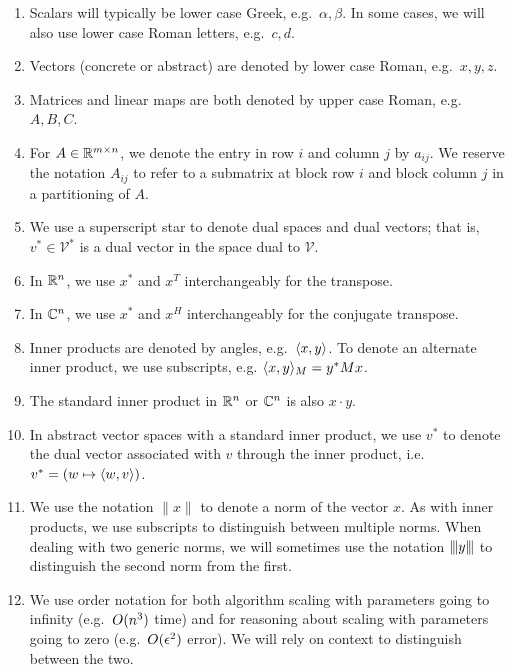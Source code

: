 \begin{enumerate}
\item
  Scalars will typically be lower case Greek, e.g.~$\alpha, \beta$. In
  some cases, we will also use lower case Roman letters, e.g.~$c, d$.

\item
  Vectors (concrete or abstract) are denoted by lower case Roman,
  e.g.~$x, y, z$.

\item
  Matrices and linear maps are both denoted by upper case Roman,
  e.g.~$A, B, C$.

\item
  For $A \in \mathbb{R}^{m \times n}$, we denote the entry in row $i$ and
  column $j$ by $a_{ij}$.  We reserve the notation $A_{ij}$ to refer to
  a submatrix at block row $i$ and block column $j$ in a partitioning of
  $A$.

\item
  We use a superscript star to denote dual spaces and dual vectors; that
  is, $v^* \in \mathcal{V}^*$ is a dual vector in the space dual to
  $\mathcal{V}$.

\item
  In $\mathbb{R}^n$, we use $x^*$ and $x^T$ interchangeably for the transpose.

\item
  In $\mathbb{C}^n$, we use $x^*$ and $x^H$ interchangeably for the conjugate
  transpose.

\item
  Inner products are denoted by angles, e.g.~$\langle x, y \rangle$. To denote an
  alternate inner product, we use subscripts, e.g. $\langle x, y \rangle_M = y^* M
  x$.

\item
  The standard inner product in $\mathbb{R}^n$ or $\mathbb{C}^n$ is also $x \cdot y$.

\item
  In abstract vector spaces with a standard inner product, we use $v^*$
  to denote the dual vector associated with $v$ through the inner
  product, i.e.~$v^* = (w \mapsto \langle w, v \rangle)$.

\item
  We use the notation $\|x\|$ to denote a norm of the vector $x$. As
  with inner products, we use subscripts to distinguish between multiple
  norms.  When dealing with two generic norms, we will sometimes use the
  notation ${\left\vert\kern-0.25ex\left\vert\kern-0.25ex\left\vert y \right\vert\kern-0.25ex\right\vert\kern-0.25ex\right\vert}$ to distinguish the second norm from the first.

\item
  We use order notation for both algorithm scaling with parameters going
  to infinity (e.g.~$O( n^3 )$ time) and for reasoning about scaling
  with parameters going to zero (e.g.~$O( \epsilon^2 )$ error). We
  will rely on context to distinguish between the two.


\end{enumerate}
